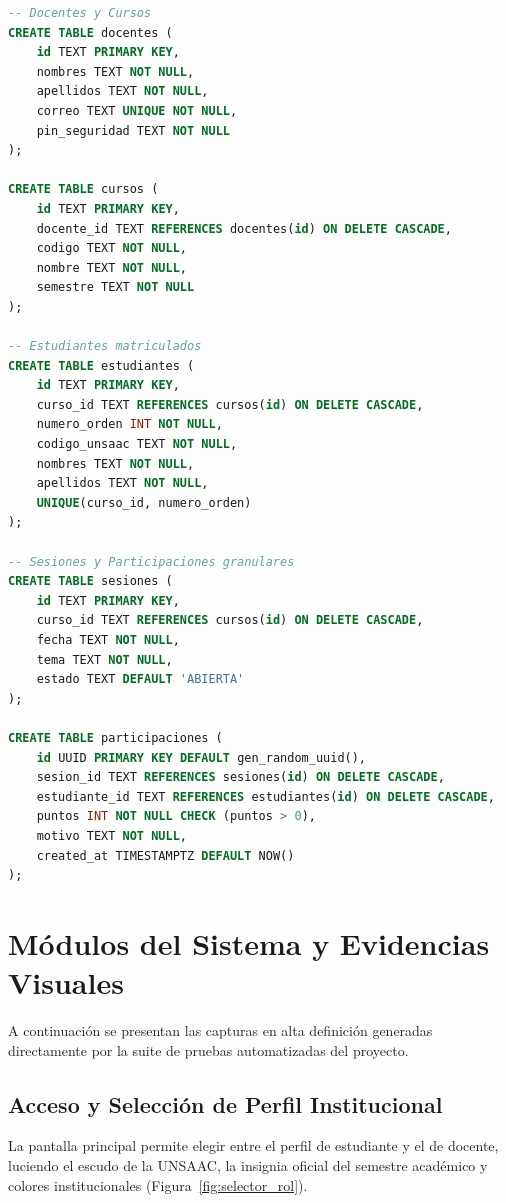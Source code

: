 \documentclass[12pt,a4paper]{article}
\begin{document}
\begin{lstlisting}[language=SQL, caption=Esquema relacional de PostgreSQL para AulaActiva.]
-- Docentes y Cursos
CREATE TABLE docentes (
    id TEXT PRIMARY KEY,
    nombres TEXT NOT NULL,
    apellidos TEXT NOT NULL,
    correo TEXT UNIQUE NOT NULL,
    pin_seguridad TEXT NOT NULL
);

CREATE TABLE cursos (
    id TEXT PRIMARY KEY,
    docente_id TEXT REFERENCES docentes(id) ON DELETE CASCADE,
    codigo TEXT NOT NULL,
    nombre TEXT NOT NULL,
    semestre TEXT NOT NULL
);

-- Estudiantes matriculados
CREATE TABLE estudiantes (
    id TEXT PRIMARY KEY,
    curso_id TEXT REFERENCES cursos(id) ON DELETE CASCADE,
    numero_orden INT NOT NULL,
    codigo_unsaac TEXT NOT NULL,
    nombres TEXT NOT NULL,
    apellidos TEXT NOT NULL,
    UNIQUE(curso_id, numero_orden)
);

-- Sesiones y Participaciones granulares
CREATE TABLE sesiones (
    id TEXT PRIMARY KEY,
    curso_id TEXT REFERENCES cursos(id) ON DELETE CASCADE,
    fecha TEXT NOT NULL,
    tema TEXT NOT NULL,
    estado TEXT DEFAULT 'ABIERTA'
);

CREATE TABLE participaciones (
    id UUID PRIMARY KEY DEFAULT gen_random_uuid(),
    sesion_id TEXT REFERENCES sesiones(id) ON DELETE CASCADE,
    estudiante_id TEXT REFERENCES estudiantes(id) ON DELETE CASCADE,
    puntos INT NOT NULL CHECK (puntos > 0),
    motivo TEXT NOT NULL,
    created_at TIMESTAMPTZ DEFAULT NOW()
);
\end{lstlisting}

\section{Módulos del Sistema y Evidencias Visuales}

A continuación se presentan las capturas en alta definición generadas directamente por la suite de pruebas automatizadas del proyecto.

\subsection{Acceso y Selección de Perfil Institucional}
La pantalla principal permite elegir entre el perfil de estudiante y el de docente, luciendo el escudo de la UNSAAC, la insignia oficial del semestre académico y colores institucionales (Figura~\ref{fig:selector_rol}).
\end{document}
